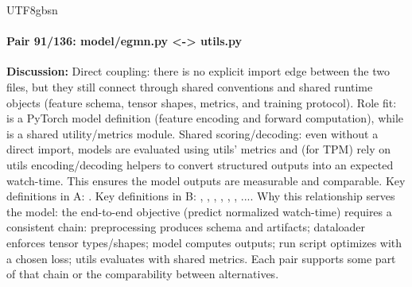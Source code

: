 \documentclass[11pt]{article}
\begin{document}
\begin{CJK*}{UTF8}{gbsn}
\paragraph{Pair 91/136: model/egmn.py <-> utils.py}
\textbf{Discussion:} Direct coupling: there is no explicit import edge between the two files, but they still connect through shared conventions and shared runtime objects (feature schema, tensor shapes, metrics, and training protocol). Role fit: \texttt{} is a PyTorch model definition (feature encoding and forward computation), while \texttt{} is a shared utility/metrics module. Shared scoring/decoding: even without a direct import, models are evaluated using utils' metrics and (for TPM) rely on utils encoding/decoding helpers to convert structured outputs into an expected watch-time. This ensures the model outputs are measurable and comparable. Key definitions in A: \texttt{}. Key definitions in B: \texttt{}, \texttt{}, \texttt{}, \texttt{}, \texttt{}, \texttt{}, .... Why this relationship serves the model: the end-to-end objective (predict normalized watch-time) requires a consistent chain: preprocessing produces schema and artifacts; dataloader enforces tensor types/shapes; model computes outputs; run script optimizes with a chosen loss; utils evaluates with shared metrics. Each pair supports some part of that chain or the comparability between alternatives.


\end{CJK*}
\end{document}

